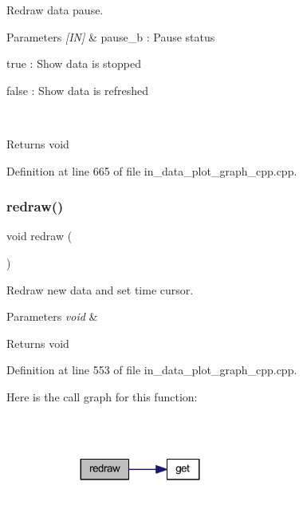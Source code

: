Redraw data pause. 


\begin{DoxyParams}{Parameters}
{\em \mbox{[}\+I\+N\mbox{]}} & pause\+\_\+b \+: Pause status \begin{DoxyItemize}
\item true \+: Show data is stopped \item false \+: Show data is refreshed \end{DoxyItemize}
\\
\hline
\end{DoxyParams}
\begin{DoxyReturn}{Returns}
void 
\end{DoxyReturn}


Definition at line 665 of file in\+\_\+data\+\_\+plot\+\_\+graph\+\_\+cpp.\+cpp.

\mbox{\label{group__data__plot_gac7680454aa76f10d7883fa41668f2fd7}} 
\subsubsection{redraw()}
{\footnotesize\ttfamily void redraw (\begin{DoxyParamCaption}\item[{void}]{ }\end{DoxyParamCaption})}



Redraw new data and set time cursor. 


\begin{DoxyParams}{Parameters}
{\em void} & \\
\hline
\end{DoxyParams}
\begin{DoxyReturn}{Returns}
void 
\end{DoxyReturn}


Definition at line 553 of file in\+\_\+data\+\_\+plot\+\_\+graph\+\_\+cpp.\+cpp.

Here is the call graph for this function\+:
\nopagebreak
\begin{figure}[H]
\begin{center}
\leavevmode
\includegraphics[width=191pt]{group__data__plot_gac7680454aa76f10d7883fa41668f2fd7_cgraph}
\end{center}
\end{figure}
\mbox{\label{group__data__plot_gaf3139465bf61f3665b4852eaf506464c}} 
